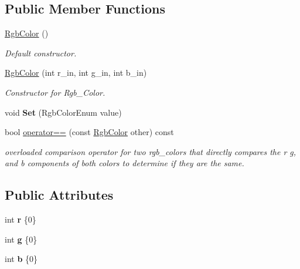 \subsection*{Public Member Functions}
\begin{DoxyCompactItemize}
\item 
\hyperlink{structRgbColor_a264da0270aca412d62197e046b71b08e}{Rgb\+Color} ()
\begin{DoxyCompactList}\small\item\em Default constructor. \end{DoxyCompactList}\item 
\hyperlink{structRgbColor_a61e213533bfff019aebd27f991688222}{Rgb\+Color} (int r\+\_\+in, int g\+\_\+in, int b\+\_\+in)
\begin{DoxyCompactList}\small\item\em Constructor for Rgb\+\_\+\+Color. \end{DoxyCompactList}\item 
void {\bfseries Set} (Rgb\+Color\+Enum value)\hypertarget{structRgbColor_a57fcd9161e0ee6a38e707c5002db55b8}{}\label{structRgbColor_a57fcd9161e0ee6a38e707c5002db55b8}

\item 
bool \hyperlink{structRgbColor_a0e17a325b797c44cd44d185753e4e588}{operator==} (const \hyperlink{structRgbColor}{Rgb\+Color} other) const \hypertarget{structRgbColor_a0e17a325b797c44cd44d185753e4e588}{}\label{structRgbColor_a0e17a325b797c44cd44d185753e4e588}

\begin{DoxyCompactList}\small\item\em overloaded comparison operator for two rgb\+\_\+colors that directly compares the r g, and b components of both colors to determine if they are the same. \end{DoxyCompactList}\end{DoxyCompactItemize}
\subsection*{Public Attributes}
\begin{DoxyCompactItemize}
\item 
int {\bfseries r} \{0\}\hypertarget{structRgbColor_aa6c2fac108029c79f7cc96fb6d34717f}{}\label{structRgbColor_aa6c2fac108029c79f7cc96fb6d34717f}

\item 
int {\bfseries g} \{0\}\hypertarget{structRgbColor_afbc54745bd4ed7ede168e31922143eff}{}\label{structRgbColor_afbc54745bd4ed7ede168e31922143eff}

\item 
int {\bfseries b} \{0\}\hypertarget{structRgbColor_af1ba4837230cfc3b0f31454ccdb03df6}{}\label{structRgbColor_af1ba4837230cfc3b0f31454ccdb03df6}

\end{DoxyCompactItemize}


